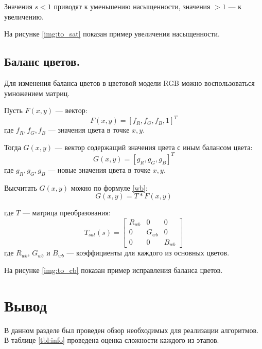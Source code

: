 Значения $s < 1$ приводят к уменьшению насыщенности, значения $> 1$ --- к увеличению. \cite{sat}

На рисунке \ref{img:to_sat} показан пример увеличения насыщенности.


\subsection{Баланс цветов.}

Для изменения баланса цветов в цветовой модели RGB можно воспользоваться умножением матриц.

Пусть $F(x,y)$ --- вектор:
\begin{equation}
	\label{F}
	F(x,y) = [f_R, f_G, f_B, 1]^T
\end{equation}
где $f_R, f_G, f_B$ --- значения цвета в точке $x,y$.

Тогда $G(x,y)$ --- вектор содержащий значения цвета с иным балансом цвета:
\begin{equation}
	\label{G}
	G(x,y) = [g_R, g_G, g_B]^T
\end{equation}
где $g_R, g_G, g_B$ --- новые значения цвета в точке $x,y$.

Высчитать $G(x,y)$ можно по формуле \ref{wb}:
\begin{equation}
	\label{wb}
	G(x,y) = T * F(x,y)
\end{equation}

где $T$ --- матрица преобразования:
\begin{equation}
	\label{twb}
	T_{sat}(s) = \begin{bmatrix}
		R_{wb} & 0 & 0 \\
		0 & G_{wb} & 0 \\ 
		0 & 0 & B_{wb} 
	\end{bmatrix}
\end{equation}
где $R_{wb}$, $G_{wb}$ и $B_{wb}$ --- коэффициенты для каждого из основных цветов.

На рисунке \ref{img:to_cb} показан пример исправления баланса цветов.

\clearpage
\section*{Вывод}

В данном разделе был проведен обзор необходимых для реализации алгоритмов. В таблице \ref{tbl:info} проведена оценка сложности каждого из этапов.

